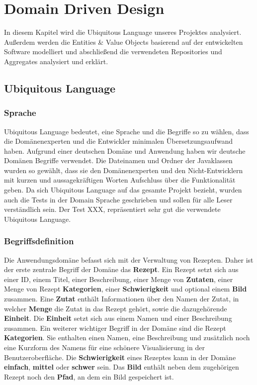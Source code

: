 \chapter{Domain Driven Design}
In diesem Kapitel wird die Ubiquitous Language unseres Projektes analysiert. Außerdem werden die Entities \& Value Objects basierend auf der entwickelten Software modelliert und abschließend die verwendeten Repositories und Aggregates analysiert und erklärt.
\section{Ubiquitous Language}
\subsection{Sprache}
Ubiquitous Language  bedeutet, eine Sprache und die Begriffe so zu wählen, dass die Domänenexperten und die Entwickler minimalen Übersetzungsaufwand haben.  Aufgrund einer deutschen Domäne und Anwendung haben wir deutsche Domänen Begriffe verwendet.
Die Dateinamen und Ordner der Javaklassen wurden so gewählt, dass sie den Domänenexperten und den Nicht-Entwicklern mit kurzen und aussagekräftigen Worten Aufschluss über die Funktionalität geben.
Da sich Ubiquitous Language  auf das gesamte Projekt bezieht, wurden auch die Tests in der Domain Sprache geschrieben und sollen für alle Leser verständlich sein. Der Test XXX, repräsentiert sehr gut die verwendete Ubiquitous Language.
\subsection{Begriffsdefinition}
Die Anwendungsdomäne befasst sich mit der Verwaltung von Rezepten. Daher ist der erste zentrale Begriff der Domäne das \textbf{Rezept}. Ein Rezept setzt sich aus einer ID, einem Titel, einer Beschreibung, einer Menge von \textbf{Zutaten}, einer Menge von Rezept \textbf{Kategorien}, einer \textbf{Schwierigkeit} und optional einem \textbf{Bild} zusammen. Eine \textbf{Zutat} enthält Informationen über den Namen der Zutat, in welcher \textbf{Menge} die Zutat in das Rezept gehört, sowie die dazugehörende \textbf{Einheit}. Die \textbf{Einheit} setzt sich aus einem Namen und einer Beschreibung zusammen.
Ein weiterer wichtiger Begriff in der Domäne sind die Rezept \textbf{Kategorien}. Sie enthalten einen Namen, eine Beschreibung und zusätzlich noch eine Kurzform des Namens für eine schönere Visualisierung in der Benutzeroberfläche.
Die \textbf{Schwierigkeit} eines Rezeptes kann in der Domäne \textbf{einfach}, \textbf{mittel} oder \textbf{schwer} sein. Das \textbf{Bild} enthält neben dem zugehörigen Rezept noch den \textbf{Pfad}, an dem ein Bild gespeichert ist.
